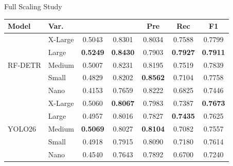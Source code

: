 \begin{frame}{Full Scaling Study}
	\centering
	\scriptsize
	\setlength{\tabcolsep}{4pt}
	\begin{tabular}{llccccc}
		\toprule
		\textbf{Model}           & \textbf{Var.} & \textbf{\mapfn} & \textbf{\mapf}  & \textbf{Pre}    & \textbf{Rec}    & \textbf{F1}     \\
		\midrule
		\multirow{5}{*}{RF-DETR} & X-Large       & 0.5043          & 0.8301          & 0.8034          & 0.7588          & 0.7799          \\
		                         & Large         & \textbf{0.5249} & \textbf{0.8430} & 0.7903          & \textbf{0.7927} & \textbf{0.7911} \\
		                         & Medium        & 0.5007          & 0.8231          & 0.8195          & 0.7519          & 0.7839          \\
		                         & Small         & 0.4829          & 0.8202          & \textbf{0.8562} & 0.7104          & 0.7758          \\
		                         & Nano          & 0.4153          & 0.7659          & 0.8222          & 0.6825          & 0.7446          \\
		\midrule
		\multirow{5}{*}{YOLO26}  & X-Large       & 0.5060          & \textbf{0.8067} & 0.7983          & 0.7387          & \textbf{0.7673} \\
		                         & Large         & 0.4957          & 0.8016          & 0.7827          & \textbf{0.7435} & 0.7625          \\
		                         & Medium        & \textbf{0.5069} & 0.8027          & \textbf{0.8104} & 0.7082          & 0.7557          \\
		                         & Small         & 0.4918          & 0.7915          & 0.8090          & 0.7180          & 0.7614          \\
		                         & Nano          & 0.4540          & 0.7643          & 0.7892          & 0.6700          & 0.7240          \\
		\bottomrule
	\end{tabular}
\end{frame}

